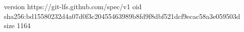 version https://git-lfs.github.com/spec/v1
oid sha256:bd15580232d4a07d0f3c20455463989b8fd9f8dbf521dcf9ecac58a3e059503d
size 1164
